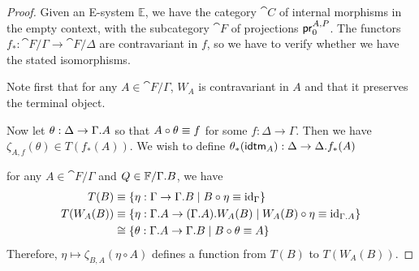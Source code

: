 \begin{proof}
Given an E-system $\mathbb{E}$, we have the category $\cat{C}$ of internal
morphisms in the empty context, with the subcategory $\cat{F}$ of projections $\cprojfstf{A}{P}$. 
The functors $f_\ast:\cat{F}/\Gamma\to\cat{F}/\Delta$ are contravariant in
$f$, so we have to verify whether we have the stated isomorphisms.

Note first that for any $A\in\cat{F}/\Gamma$, $W_A$ is
contravariant in $A$ and that it preserves the terminal object. 

Now let $\theta:\Delta\to\ctxext{\Gamma}{A}$ so that $A\circ\theta\equiv f$
for some $f:\Delta\to\Gamma$. Then we have $\zeta_{A,f}(\theta)\in T(f_\ast(A))$.  
We wish to define $\theta_\ast(\idtm{A}):\Delta\to\ctxext{\Delta}{f_\ast(A)}$

for any $A\in\cat{F}/\Gamma$ and $Q\in\cat{F}/\ctxext{\Gamma}{B}$, we have
\begin{align*}
T(B) 
  & \jdeq 
\{ \eta : \Gamma \to\ctxext{\Gamma}{B}
        \mid B\circ\eta\jdeq\catid{\Gamma}\}
  \\
T(W_A(B))
  & \jdeq
\{ \eta : \ctxext{\Gamma}{A}\to\ctxext{{\Gamma}{A}}{W_A(B)}
        \mid W_A(B)\circ\eta\jdeq\catid{\ctxext{\Gamma}{A}}\}
  \\
  & \cong
\{ \theta : \ctxext{\Gamma}{A}\to\ctxext{\Gamma}{B}\mid B\circ\theta\jdeq A\}
\end{align*}
Therefore, $\eta\mapsto \zeta_{B,A}(\eta\circ A)$ defines a function from
$T(B)$ to $T(W_A(B))$. 
\end{proof}


